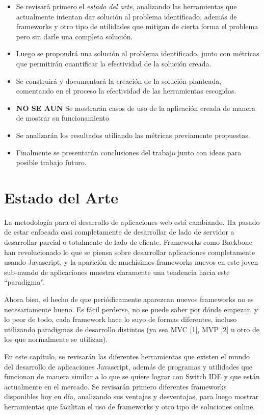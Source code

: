 \documentclass[12pt,titlepage,]{article}
\begin{document}
\begin{itemize}
\item
  Se revisará primero el \emph{estado del arte}, analizando las
  herramientas que actualmente intentan dar solución al problema
  identificado, además de frameworks y otro tipo de utilidades que
  mitigan de cierta forma el problema pero sin darle una completa
  solución.
\item
  Luego se propondrá una solución al problema identificado, junto con
  métricas que permitirán cuantificar la efectividad de la solución
  creada.
\item
  Se construirá y documentará la creación de la solución planteada,
  comentando en el proceso la efectividad de las herramientas escogidas.
\item
  \textbf{NO SE AUN} Se mostrarán casos de uso de la aplicación creada
  de manera de mostrar su funcionamiento
\item
  Se analizarán los resultados utiliando las métricas previamente
  propuestas.
\item
  Finalmente se presentarán conclusiones del trabajo junto con ideas
  para posible trabajo futuro.
\end{itemize}

\newpage

\section{Estado del Arte}

La metodología para el desarrollo de aplicaciones web está cambiando. Ha
pasado de estar enfocada casi completamente de desarrollar de lado de
servidor a desarrollar parcial o totalmente de lado de cliente.
Frameworks como Backbone han revolucionado lo que se piensa sobre
desarrollar aplicaciones completamente usando Javascript, y la aparición
de muchísimos frameworks nuevos en este joven sub-mundo de aplicaciones
muestra claramente una tendencia hacia este ``paradigma''.

Ahora bien, el hecho de que periódicamente aparezcan nuevos frameworks
no es necesariamente bueno. Es fácil perderse, no se puede saber por
dónde empezar, y lo peor de todo, cada framework hace lo suyo de formas
diferentes, incluso utilizando paradigmas de desarrollo distintos (ya
sea MVC {[}1{]}, MVP {[}2{]} u otro de los que normalmente se utilizan).

En este capítulo, se revisarán las diferentes herramientas que existen
el mundo del desarrollo de aplicaciones Javascript, además de programas
y utilidades que funcionan de manera similar a lo que se quiere lograr
con Switch IDE y que están actualmente en el mercado. Se revisarán
primero diferentes frameworks disponibles hoy en día, analizando sus
ventajas y desventajas, para luego mostrar herramientas que facilitan el
uso de frameworks y otro tipo de soluciones online.
\end{document}
